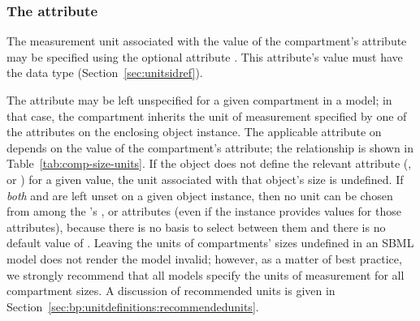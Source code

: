 \subsubsection{The  attribute}
\label{sec:compartment-units}

The measurement unit associated with the value of the
compartment's  attribute may be specified using the
optional attribute .  This attribute's value must
have the data type 
(Section~\ref{sec:unitsidref}).

The  attribute may be left unspecified for a given
compartment in a model; in that case, the compartment inherits the
unit of measurement specified by one of the attributes on the
enclosing \Model object instance.  The applicable attribute on
\Model depends on the value of the compartment's
 attribute; the relationship is shown in
Table~\vref{tab:comp-size-units}.  If the \Model object does not
define the relevant attribute (,
 or ) for a given
 value, the unit associated with that
\Compartment object's size is undefined.  If \emph{both}
 and  are left unset on a
given \Compartment object instance, then no unit can be chosen
from among the \Model's ,  or
 attributes (even if the \Model instance
provides values for those attributes), because there is no basis
to select between them and there is no default value of
.  Leaving the units of compartments'
sizes undefined in an SBML model does not render the model
invalid; however, as a matter of best practice, we strongly
recommend that all models specify the units of measurement for all
compartment sizes.  A discussion of recommended units is given in
Section~\ref{sec:bp:unitdefinitions:recommendedunits}.
  
